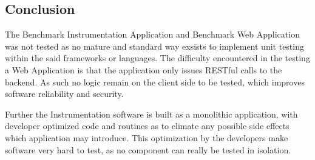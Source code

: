 \documentclass[11pt,a4paper]{article}
\begin{document}
\subsection{Conclusion}\label{conclusion}
The Benchmark Instrumentation Application and Benchmark Web Application was not
tested as no mature and standard way exsists to implement unit testing within the
said frameworks or languages. The difficulty encountered in the testing a Web Application
is that the application only issues RESTful calls to the backend. As such no logic
remain on the client side to be tested, which improves software reliability and security.

Further the Instrumentation software is built as a monolithic application, with
developer optimized code and routines as to elimate any possible side effects
which application may introduce. This optimization by the developers make software
very hard to test, as no component can really be tested in isolation.
\end{document}
